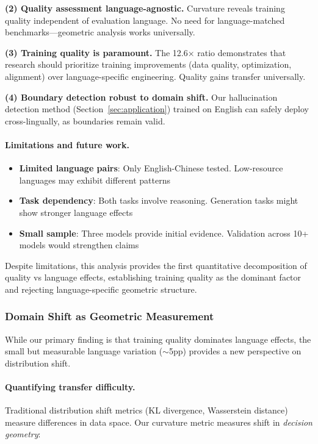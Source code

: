 \documentclass[11pt]{article}
\begin{document}
\textbf{(2) Quality assessment language-agnostic.} Curvature reveals training quality independent of evaluation language. No need for language-matched benchmarks---geometric analysis works universally.

\textbf{(3) Training quality is paramount.} The 12.6× ratio demonstrates that research should prioritize training improvements (data quality, optimization, alignment) over language-specific engineering. Quality gains transfer universally.

\textbf{(4) Boundary detection robust to domain shift.} Our hallucination detection method (Section~\ref{sec:application}) trained on English can safely deploy cross-lingually, as boundaries remain valid.

\paragraph{Limitations and future work.}
\begin{itemize}
\item \textbf{Limited language pairs}: Only English-Chinese tested. Low-resource languages may exhibit different patterns
\item \textbf{Task dependency}: Both tasks involve reasoning. Generation tasks might show stronger language effects  
\item \textbf{Small sample}: Three models provide initial evidence. Validation across 10+ models would strengthen claims
\end{itemize}

Despite limitations, this analysis provides the first quantitative decomposition of quality vs language effects, establishing training quality as the dominant factor and rejecting language-specific geometric structure.

\subsubsection{Domain Shift as Geometric Measurement}
\label{sec:domain_shift_geometry}

While our primary finding is that training quality dominates language effects, the small but measurable language variation ($\sim$5pp) provides a new perspective on distribution shift.

\paragraph{Quantifying transfer difficulty.}
Traditional distribution shift metrics (KL divergence, Wasserstein distance) measure differences in data space. Our curvature metric measures shift in \textit{decision geometry}:
\end{document}
